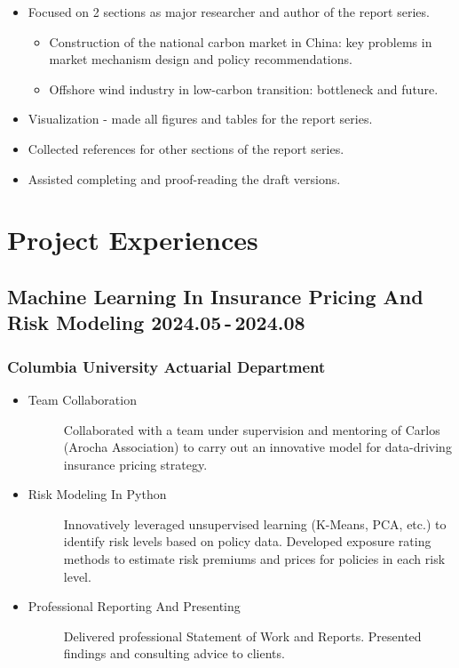 \documentclass[a4paper]{article}
\begin{document}
\begin{itemize}
    \item Focused on 2 sections as major researcher and author of the report series.
    \begin{itemize}
        \item Construction of the national carbon market in China: key problems in market mechanism design and policy recommendations.
        \item Offshore wind industry in low-carbon transition: bottleneck and future.
    \end{itemize}
    \item Visualization - made all figures and tables for the report series. 
    \item Collected references for other sections of the report series. 
    \item Assisted completing and proof-reading the draft versions.
\end{itemize}

\hypertarget{project-exp}{
    \section{Project Experiences}
}
\hypertarget{integrated}{
    \subsection{Machine Learning In Insurance Pricing And Risk Modeling \normalfont \hfill 2024.05\,-\,2024.08} 
}

\subsubsection{Columbia University Actuarial Department} 
\vspace{3pt}
\begin{itemize}
    \item\begin{description}
        \item[Team Collaboration] Collaborated with a team under supervision and mentoring of Carlos (Arocha Association) to carry out an innovative model for data-driving insurance pricing strategy.
    \end{description}
    \item\begin{description}
        \item[Risk Modeling In Python] Innovatively leveraged unsupervised learning (K-Means, PCA, etc.) to identify risk levels based on policy data. Developed exposure rating methods to estimate risk premiums and prices for policies in each risk level.
    \end{description}
    \item\begin{description}
        \item[Professional Reporting And Presenting] Delivered professional Statement of Work and Reports. Presented findings and consulting advice to clients.
    \end{description}
\end{itemize} 
\end{document}
